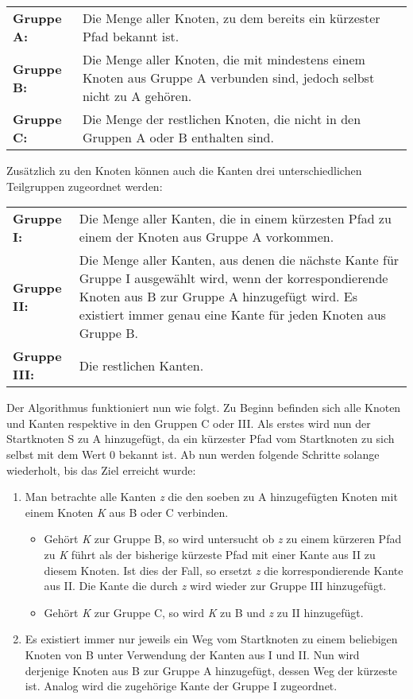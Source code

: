 	\begin{tabular}{p{2.5cm} p{10cm}}	
		\textbf{Gruppe A:} & Die Menge aller Knoten, zu dem bereits ein kürzester Pfad bekannt ist.\\[0.25cm]
		\textbf{Gruppe B:} & Die Menge aller Knoten, die mit mindestens einem Knoten aus Gruppe A verbunden sind, jedoch selbst nicht zu A gehören.\\[0.25cm]
		\textbf{Gruppe C:} & Die Menge der restlichen Knoten, die nicht in den Gruppen A oder B enthalten sind.\\[0.25cm]
	\end{tabular}
	
	Zusätzlich zu den Knoten können auch die Kanten drei unterschiedlichen Teilgruppen zugeordnet werden\cite{DijkstraAlg}:
	
	\begin{tabular}{p{2.5cm} p{10cm}}
		\textbf{Gruppe I:} & Die Menge aller Kanten, die in einem kürzesten Pfad zu einem der Knoten aus Gruppe A vorkommen.\\[0.25cm]
		\textbf{Gruppe II:} & Die Menge aller Kanten, aus denen die nächste Kante für Gruppe I ausgewählt wird, wenn der korrespondierende Knoten aus B zur Gruppe A hinzugefügt wird. Es existiert immer genau eine Kante für jeden Knoten aus Gruppe B. \\[0.25cm]
		\textbf{Gruppe III:} & Die restlichen Kanten.\\[0.25cm]
	\end{tabular}
	
	Der Algorithmus funktioniert nun wie folgt. Zu Beginn befinden sich alle Knoten und Kanten respektive in den Gruppen C oder III. Als erstes wird nun der Startknoten S zu A hinzugefügt, da ein kürzester Pfad vom Startknoten zu sich selbst mit dem Wert 0 bekannt ist. Ab nun werden folgende Schritte solange wiederholt, bis das Ziel erreicht wurde:
	\begin{enumerate}
		\item Man betrachte alle Kanten \textit{z} die den soeben zu A hinzugefügten Knoten mit einem Knoten \textit{K} aus B oder C verbinden. 
		\begin{itemize}
			\item Gehört \textit{K} zur Gruppe B, so wird untersucht ob \textit{z} zu einem kürzeren Pfad zu \textit{K} führt als der bisherige kürzeste Pfad mit einer Kante aus II zu diesem Knoten. Ist dies der Fall, so ersetzt \textit{z} die korrespondierende Kante aus II. Die Kante die durch \textit{z} wird wieder zur Gruppe III hinzugefügt.
			\item Gehört \textit{K} zur Gruppe  C, so wird \textit{K} zu B und \textit{z} zu II hinzugefügt.
		\end{itemize}
		\item Es existiert immer nur jeweils ein Weg vom Startknoten zu einem beliebigen Knoten von B unter Verwendung der Kanten aus I und II. Nun wird derjenige Knoten aus B zur Gruppe A hinzugefügt, dessen Weg der kürzeste ist. Analog wird die zugehörige Kante der Gruppe I zugeordnet.
	\end{enumerate}
	
